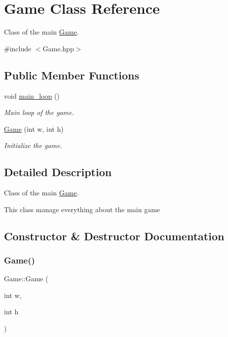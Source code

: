 \hypertarget{classGame}{}\section{Game Class Reference}
\label{classGame}


Class of the main \hyperlink{classGame}{Game}.  




{\ttfamily \#include $<$Game.\+hpp$>$}

\subsection*{Public Member Functions}
\begin{DoxyCompactItemize}
\item 
\mbox{\label{classGame_a9e9a77d478f0c0bfb9b61fb1a6556e15}} 
void \hyperlink{classGame_a9e9a77d478f0c0bfb9b61fb1a6556e15}{main\+\_\+loop} ()
\begin{DoxyCompactList}\small\item\em Main loop of the game. \end{DoxyCompactList}\item 
\hyperlink{classGame_a2b0cb8af7b823a6d595eef9c9641f806}{Game} (int w, int h)
\begin{DoxyCompactList}\small\item\em Initialize the game. \end{DoxyCompactList}\end{DoxyCompactItemize}


\subsection{Detailed Description}
Class of the main \hyperlink{classGame}{Game}. 

This class manage everything about the main game 

\subsection{Constructor \& Destructor Documentation}
\mbox{\label{classGame_a2b0cb8af7b823a6d595eef9c9641f806}} 
\subsubsection{\texorpdfstring{Game()}{Game()}}
{\footnotesize\ttfamily Game\+::\+Game (\begin{DoxyParamCaption}\item[{int}]{w,  }\item[{int}]{h }\end{DoxyParamCaption})}



